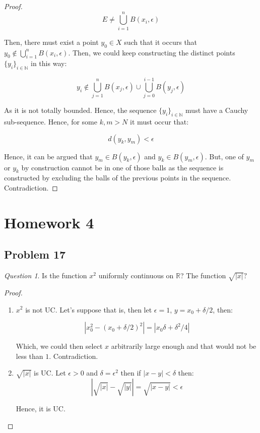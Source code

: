 \documentclass[11pt]{article}
\theoremstyle{definition}
\theoremstyle{remark}
\theoremstyle{remark}
\newtheorem{question}{Question}
\newcommand{\N}{\mathbb{N}}
\newcommand{\R}{{\mathbb{R}}}
\begin{document}
\begin{proof}
  \begin{equation}
    E \ne \bigcup_{i=1}^nB(x_i, \epsilon)
  \end{equation}

  Then, there must exist a point $y_0 \in X$ such that it occurs that
  $y_0 \notin \bigcup_{i=1}^nB(x_i, \epsilon)$. Then, we could keep
  constructing the distinct points $\{y_i\}_{i \in \N}$ in this way:

  \begin{equation}
    y_i \notin \bigcup_{j=1}^nB(x_j, \epsilon) \cup \bigcup_{j=0}^{i-1}B(y_j, \epsilon)
  \end{equation}

  As it is not totally bounded. Hence, the sequence
  $\{y_i\}_{i \in \N}$ must have a Cauchy sub-sequence. Hence, for
  some $k,m > N$ it must occur that:

  \begin{equation}
    d(y_k, y_m) < \epsilon
  \end{equation}

  Hence, it can be argued that $y_m \in B(y_k, \epsilon)$ and
  $y_k \in B(y_m, \epsilon)$. But, one of $y_m$ or $y_k$ by
  construction cannot be in one of those balls as the sequence is
  constructed by excluding the balls of the previous points in the
  sequence. Contradiction.
\end{proof}

\section{Homework 4}
\subsection{Problem 17}
\begin{question}
  Is the function $x^2$ uniformly continuous on $\R$? The function
  $\sqrt{|x|}?$
\end{question}

\begin{proof}
  \begin{enumerate}
  \item $x^2$ is not UC. Let's suppose that is, then let $\epsilon = 1$, $y = x_0 + \delta / 2$, then:

    \begin{equation*}
      |x_0^2 - (x_0 + \delta/2)^2| = |x_0\delta + \delta^2/4|
    \end{equation*}

    Which, we could then select $x$ arbitrarily large enough and that
    would not be less than $1$. Contradiction.

  \item $\sqrt{|x|}$ is UC. Let $\epsilon > 0$ and
    $\delta = \epsilon^2$ then if $|x-y| < \delta$ then:
    \begin{equation*}
      |\sqrt{|x|} - \sqrt{|y|}| = \sqrt{|x - y|} < \epsilon
    \end{equation*}

    Hence, it is UC.
  \end{enumerate}
\end{proof}
\end{document}
